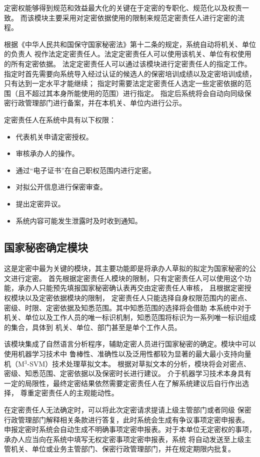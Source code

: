 定密权能够得到规范和效益最大化的关键在于定密的专职化、规范化以及权责一致\cite{lunwoguodingmiquanzhuanzhi}。
而该模块主要采用对定密依据使用的限制来规范定密责任人进行定密的流程。

根据《中华人民共和国保守国家秘密法》第十二条的规定，系统自动将机关、单位的负责人
视作法定定密责任人。法定定密责任人可以使用该机关、单位有权使用的所有定密依据。
法定定密责任人可以通过该模块进行定密责任人的指定工作。
指定时首先需要向系统导入经过认证的候选人的保密培训成绩以及定密培训成绩，只有达到一定水平才能继续；
指定时需要法定定密责任人选定一些定密依据的范围（且不超过其本身所能使用的范围）进行指定。
指定后系统将会自动向同级保密行政管理部门进行备案，并在本机关、单位内进行公示。

定密责任人在系统中具有以下权限：
\begin{itemize}
    \item 代表机关申请定密授权。
    \item 审核承办人的操作。
    \item 通过“电子证书”在自己职权范围内进行定密。
    \item 对拟公开信息进行保密审查。
    \item 提出定密异议。
    \item 系统内容可能发生泄露时及时收到通知。
\end{itemize}

\subsection{国家秘密确定模块}
这是定密中最为关键的模块，其主要功能即是将承办人草拟的拟定为国家秘密的公文进行定密。
首先根据定密责任人模块的限制，只有定密责任人可以使用这个功能，承办人只能预先填报国家秘密确认表再交由定密责任人审核，
且根据定密授权模块以及定密依据模块的限制，
定密责任人只能选择自身权限范围内的密点、密级、时限、定密依据及知悉范围。其中知悉范围的选择将会借助
本系统中对于机关、单位以及工作人员的唯一标识机制，知悉范围将标识为一系列唯一标识组成的集合，具体到
机关、单位、部门甚至是单个工作人员。

该模块集成了自然语言分析程序，辅助定密人员进行国家秘密的确定。模块中可以使用机器学习技术中
鲁棒性、准确性以及泛用性都较为显著的最大最小支持向量机（M\(^3\)-SVM）技术处理草拟文本\cite{jiyujiqixuexi}。
根据对草拟文本的分析，模块将会对密点、密级、知悉范围、定密依据以及保密时长进行建议。
介于机器学习技术本身具有一定的局限性，最终定密结果依然需要定密责任人在了解系统建议后自行作出选择，
尊重定密责任人的主观能动性。

在定密责任人无法确定时，可以将此次定密请求提请上级主管部门或者同级
保密行政管理部门解释相关条款进行答复，此时系统会生成有争议事项定密申报表。
申报定密时系统会自动生成不明确事项定密申报表。对于本单位无定密权的事项，承办人应当向在系统中填写无权定密事项定密申报表，系统
将自动发送至上级主管机关、单位或业务主管部门、保密行政管理部门，并在规定期限内批复。

